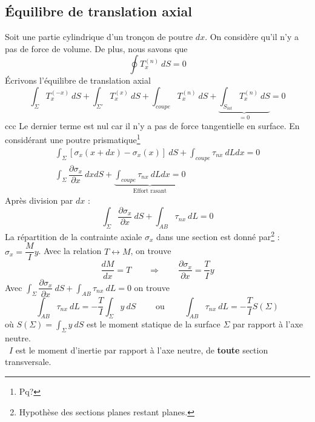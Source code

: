 	\subsection{Équilibre de translation axial}
	Soit une partie cylindrique d'un tronçon de poutre $dx$. On considère qu'il 
	n'y a pas de force de volume. De plus, nous savons que
	\begin{equation}
	\oint T_x^{(n)}\ dS = 0
	\end{equation}
	Écrivons l'équilibre de translation axial
	\begin{equation}
	\int_\Sigma T_x^{(-x)}\ dS + \int_{\Sigma'} T_x^{(x)}\ dS + \int_{coupe} T_x^{(n)}\ 
	dS + \underbrace{\int_{S_{lat}}T_x^{(n)}\ dS}_{=0} = 0
	\end{equation}\newpage	ccc
	Le dernier terme est nul car il n'y a pas de force tangentielle en surface. 
	En considérant une poutre prismatique\footnote{Pq?}
	\begin{eqnarray}
	\int_\Sigma [\sigma_x(x+dx)-\sigma_x(x)]\ dS + \int_{coupe} \tau_{nx}\ dLdx = 0\\
	\int_\Sigma \dfrac{\partial \sigma_x}{\partial x}\ dxdS + \underbrace{\int_{coupe} 
	\tau_{nx}\ 	dLdx = 0}_{\text{Effort rasant}}
	\end{eqnarray}
	Après division par $dx$ :
	\begin{equation}
	\int_\Sigma \dfrac{\partial \sigma_x}{\partial x}\ dS + \int_{AB}\tau_{nx}\ dL=0
	\end{equation}
	La répartition de la contrainte 
	axiale $\sigma_x$ dans une section est donné par\footnote{Hypothèse des sections 
	planes restant planes.} :$\sigma_x = \dfrac{M}{I}y$.
	Avec la relation $T\leftrightarrow M$, on trouve 
	\begin{equation}
	\dfrac{dM}{dx}= T\qquad\Longrightarrow\qquad \dfrac{\partial\sigma_x}{\partial x}
	=\dfrac{T}{I}y
	\end{equation}
	Avec $\int_\Sigma \dfrac{\partial \sigma_x}{\partial x}\ dS + \int_{AB}\tau_{nx}\ 
	dL=0$ on trouve
	\begin{equation}
	\int_{AB}\tau_{nx}\ dL = -\dfrac{T}{I}\int_\Sigma y\ dS\qquad\text{ ou }\qquad 
	\int_{AB} \tau_{nx}\ dL = -\dfrac{T}{I}S(\Sigma)
	\end{equation}
	où $S(\Sigma) = \int_\Sigma y\ dS$ est le moment statique de la surface $\Sigma$ 
	par rapport à l'axe neutre.\\
	\danger\  $I$ est le moment d'inertie par rapport à l'axe neutre, de \textbf{toute} 
	section transversale.
	
